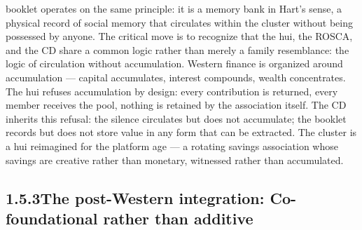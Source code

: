 booklet operates on the same principle: it is a memory bank in Hart’s sense, a physical record of social memory that circulates within the cluster without being possessed by anyone. The critical move is to recognize that the hui, the ROSCA, and the CD share a common logic rather than merely a family resemblance: the logic of circulation without accumulation. Western finance is organized around accumulation — capital accumulates, interest compounds, wealth concentrates. The hui refuses accumulation by design: every contribution is returned, every member receives the pool, nothing is retained by the association itself. The CD inherits this refusal: the silence circulates but does not accumulate; the booklet records but does not store value in any form that can be extracted. The cluster is a hui reimagined for the platform age — a rotating savings association whose savings are creative rather than monetary, witnessed rather than accumulated.

\subsection{1.5.3\quad The post-Western integration: Co-foundational rather than additive}

